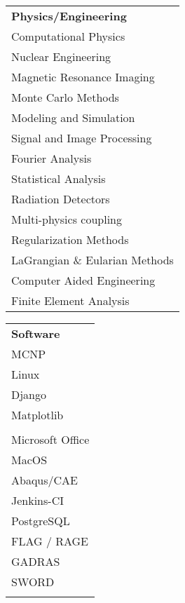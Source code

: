 
\begin{minipage}{0.31\textwidth}
\begin{tabular}{l}
	{\large\textbf{Physics/Engineering}} \\
	\highskillbw Computational Physics \\
	\highskillbw Nuclear Engineering \\
	\highskillbw Magnetic Resonance Imaging \\ 
	\highskillbw Monte Carlo Methods \\
	\highskillbw Modeling and Simulation \\
	\highskillbw Signal and Image Processing \\
	\highskillbw Fourier Analysis \\ 
	\medskillbw Statistical Analysis \\
	\medskillbw Radiation Detectors \\
	\medskillbw Multi-physics coupling \\
	\medskillbw Regularization Methods  \\
	\medskillbw LaGrangian \& Eularian Methods \\
	\lowskillbw Computer Aided Engineering \\
	\lowskillbw Finite Element Analysis \\
\end{tabular}
\end{minipage}%
\begin{minipage}{0.18\textwidth}
	\begin{center}
\begin{tabular}{l}
	{\large\textbf{Software}} \\
	\highskillbw \textsc{MCNP} \\
	\highskillbw Linux \\ 
	\highskillbw Django  \\
	\highskillbw Matplotlib \\ 
	\highskillbw {\fontfamily{ptm}\selectfont \LaTeX} \\ 
	\highskillbw Microsoft Office \\
	\highskillbw MacOS \\
	\medskillbw Abaqus/CAE \\
	\medskillbw Jenkins-CI \\
	\medskillbw PostgreSQL \\
	\lowskillbw FLAG / RAGE \\
	\lowskillbw GADRAS \\
	\lowskillbw SWORD \\
	\\
\end{tabular}
	\end{center}
\end{minipage}%
